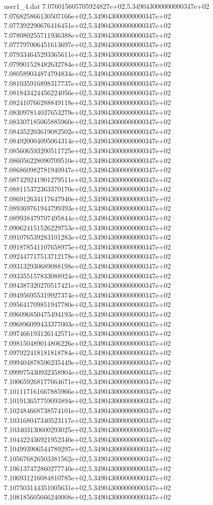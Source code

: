 \begin{filecontents}{user1_4.dat}
7.076015605705924827e+02,5.349043000000000347e+02
7.076825866130507166e+02,5.349043000000000347e+02
7.077392290676416451e+02,5.349043000000000347e+02
7.078080255711936388e+02,5.349043000000000347e+02
7.077797006451613697e+02,5.349043000000000347e+02
7.079334645293365611e+02,5.349043000000000347e+02
7.079901528482632784e+02,5.349043000000000347e+02
7.080589034874794834e+02,5.349043000000000347e+02
7.081035916898317737e+02,5.349043000000000347e+02
7.081843424456224056e+02,5.349043000000000347e+02
7.082410766288849118e+02,5.349043000000000347e+02
7.083097814037653279e+02,5.349043000000000347e+02
7.083307185065885960e+02,5.349043000000000347e+02
7.084352203619082502e+02,5.349043000000000347e+02
7.084920004095064314e+02,5.349043000000000347e+02
7.085606593200511725e+02,5.349043000000000347e+02
7.086056228090709510e+02,5.349043000000000347e+02
7.086860982781940947e+02,5.349043000000000347e+02
7.087429241901279511e+02,5.349043000000000347e+02
7.088115372363370170e+02,5.349043000000000347e+02
7.086912634117647940e+02,5.349043000000000347e+02
7.089369761944799393e+02,5.349043000000000347e+02
7.089938479707495844e+02,5.349043000000000347e+02
7.090624151526229753e+02,5.349043000000000347e+02
7.091076539283101283e+02,5.349043000000000347e+02
7.091878541107658975e+02,5.349043000000000347e+02
7.092447717513712178e+02,5.349043000000000347e+02
7.093132930689088198e+02,5.349043000000000347e+02
7.093355157833088924e+02,5.349043000000000347e+02
7.094387320270517421e+02,5.349043000000000347e+02
7.094956955319927374e+02,5.349043000000000347e+02
7.095641709851947780e+02,5.349043000000000347e+02
7.096096850475494193e+02,5.349043000000000347e+02
7.096896099433377003e+02,5.349043000000000347e+02
7.097466193126142571e+02,5.349043000000000347e+02
7.098150489014806226e+02,5.349043000000000347e+02
7.097922418181818784e+02,5.349043000000000347e+02
7.099404878596235449e+02,5.349043000000000347e+02
7.099975430932358904e+02,5.349043000000000347e+02
7.100659268177664671e+02,5.349043000000000347e+02
7.101117161667885966e+02,5.349043000000000347e+02
7.101913657759093894e+02,5.349043000000000347e+02
7.102484668738574101e+02,5.349043000000000347e+02
7.103168047340523117e+02,5.349043000000000347e+02
7.103403130600293025e+02,5.349043000000000347e+02
7.104422436921952340e+02,5.349043000000000347e+02
7.104993906544789297e+02,5.349043000000000347e+02
7.105676826503381562e+02,5.349043000000000347e+02
7.106137472860277740e+02,5.349043000000000347e+02
7.106931216084810785e+02,5.349043000000000347e+02
7.107503144351005631e+02,5.349043000000000347e+02
7.108185605666240008e+02,5.349043000000000347e+02

\end{filecontents}
